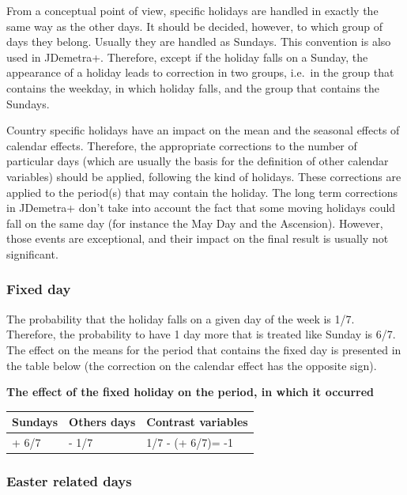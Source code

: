 \documentclass[
  letterpaper,
  DIV=11,
  numbers=noendperiod]{scrreprt}
\begin{document}
From a conceptual point of view, specific holidays are handled in
exactly the same way as the other days. It should be decided, however,
to which group of days they belong. Usually they are handled as Sundays.
This convention is also used in JDemetra+. Therefore, except if the
holiday falls on a Sunday, the appearance of a holiday leads to
correction in two groups, i.e.~in the group that contains the weekday,
in which holiday falls, and the group that contains the Sundays.

Country specific holidays have an impact on the mean and the seasonal
effects of calendar effects. Therefore, the appropriate corrections to
the number of particular days (which are usually the basis for the
definition of other calendar variables) should be applied, following the
kind of holidays. These corrections are applied to the period(s) that
may contain the holiday. The long term corrections in JDemetra+ don't
take into account the fact that some moving holidays could fall on the
same day (for instance the May Day and the Ascension). However, those
events are exceptional, and their impact on the final result is usually
not significant.

\hypertarget{fixed-day}{%
\subsubsection{Fixed day}\label{fixed-day}}

The probability that the holiday falls on a given day of the week is
1/7. Therefore, the probability to have 1 day more that is treated like
Sunday is 6/7. The effect on the means for the period that contains the
fixed day is presented in the table below (the correction on the
calendar effect has the opposite sign).

\textbf{The effect of the fixed holiday on the period, in which it
occurred}

\begin{longtable}[]{@{}lll@{}}
\toprule()
\textbf{Sundays} & \textbf{Others days} & \textbf{Contrast variables} \\
\midrule()
\endhead
+ 6/7 & - 1/7 & 1/7 - (+ 6/7)= -1 \\
\bottomrule()
\end{longtable}

\hypertarget{easter-related-days}{%
\subsubsection{Easter related days}\label{easter-related-days}}
\end{document}
